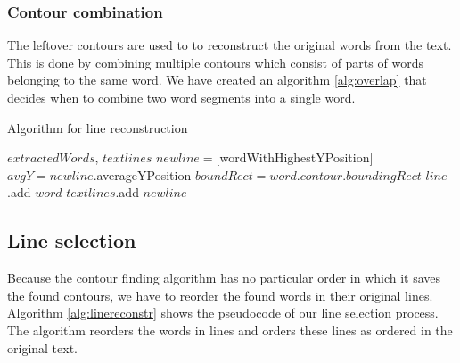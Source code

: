 \documentclass{article}
\begin{document}
\subsubsection{Contour combination}
The leftover contours are used to to reconstruct the original words from the text.
This is done by combining multiple contours which consist of parts of words belonging to the same word. 
We have created an algorithm \ref{alg:overlap} that decides when to combine two word segments into a single word. 



\begin{algorithm}[tb]
   \caption{Algorithm for line reconstruction}
   \label{alg:linereconstr}
\begin{algorithmic}
    $extractedWords$, $textlines$
   \REPEAT
        \STATE $newline = [ $wordWithHighestYPosition$ ]$
        \STATE $avgY= newline$.averageYPosition
        \REPEAT
            \STATE $boundRect = word.contour.boundingRect$
            \STATE $line$.add $word$
            \ENDIF
        \ENDFOR
        \STATE $textlines$.add $newline$
\end{algorithmic}
\end{algorithm}

\subsection{Line selection}
Because the contour finding algorithm has no particular order in which it saves the found contours, we have to reorder the found words in their original lines.
Algorithm \ref{alg:linereconstr} shows the pseudocode of our line selection process.
The algorithm reorders the words in lines and orders these lines as ordered in the original text.
\end{document}
